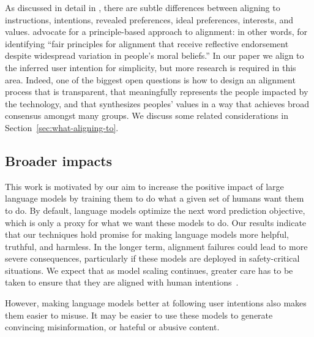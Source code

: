 \documentclass{article}
\begin{document}
As discussed in detail in \citet{gabriel2020artificial}, there are subtle differences between aligning to instructions, intentions, revealed preferences, ideal preferences, interests, and values. \citet{gabriel2020artificial} advocate for a principle-based approach to alignment: in other words, for identifying ``fair principles for alignment that receive reflective endorsement despite widespread
variation in people's moral beliefs.” In our paper we align to the inferred user intention for simplicity, but more research is required in this area.
Indeed, one of the biggest open questions is how to design an alignment process that is transparent, that meaningfully represents the people impacted by the technology, and that synthesizes peoples' values in a way that achieves broad consensus amongst many groups. We discuss some related considerations in Section~\ref{sec:what-aligning-to}.


\subsection{Broader impacts}
\label{sec:broader-impact}

This work is motivated by our aim to increase the positive impact of large language models by training them to do what a given set of humans want them to do. By default, language models optimize the next word prediction objective, which is only a proxy for what we want these models to do. Our results indicate that our techniques hold promise for making language models more helpful, truthful, and harmless. In the longer term, alignment failures could lead to more severe consequences, particularly if these models are deployed in safety-critical situations. We expect that as model scaling continues, greater care has to be taken to ensure that they are aligned with human intentions~\citep{bostrom2014superintelligence}.

However, making language models better at following user intentions also makes them easier to misuse. It may be easier to use these models to generate convincing misinformation, or hateful or abusive content. 
\end{document}
